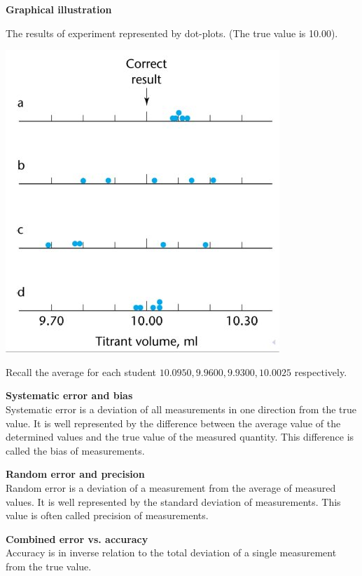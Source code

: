 \documentclass[compress]{beamer}        %
\begin{document}
\begin{frame}
\textbf{Graphical illustration}


The results of experiment represented by dot-plots. (The true value is 10.00).

\begin{center}
\includegraphics[scale=0.6]{Image10}
\end{center}
\end{frame}
\begin{frame}
Recall the average for each student $ 10.0950, 9.9600, 9.9300, 10.0025 $ respectively.
\newpage

\textbf{Systematic error and bias}\\
Systematic error is a deviation of all measurements in one direction from the true value. It is well represented by the difference between the average value of the determined values and the true value
of the measured quantity. This difference is called the bias of measurements.

\textbf{Random error and precision}\\
Random error is a deviation of a measurement from the average of measured values.
It is well represented by the standard deviation of measurements.
This value is often called precision of measurements.

\textbf{Combined error vs. accuracy}\\
Accuracy is in inverse relation to the total deviation of a single measurement from the true value.
\end{frame}
\end{document}
